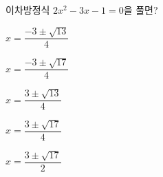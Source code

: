 이차방정식 $2x^2-3x-1=0$을 풀면?
\begin{choicesii}{\rule[-3ex]{0pt}{8ex}$x=\dfrac{-3\pm\sqrt{13}}{4}$}{\rule[-3ex]{0pt}{8ex}$x=\dfrac{-3\pm\sqrt{17}}{4}$}{\rule[-3ex]{0pt}{8ex}$x=\dfrac{3\pm\sqrt{13}}{4}$}{\rule[-3ex]{0pt}{8ex}$x=\dfrac{3\pm\sqrt{17}}{4}$}{\rule[-3ex]{0pt}{8ex}$x=\dfrac{3\pm\sqrt{17}}{2}$}\end{choicesii}
